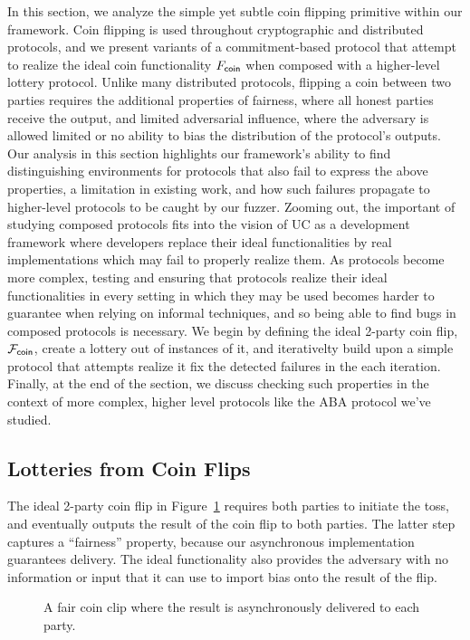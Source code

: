 In this section, we analyze the simple yet subtle coin flipping primitive within our framework.
Coin flipping is used throughout cryptographic and distributed protocols, and we present variants of a commitment-based protocol that attempt to realize the ideal coin functionality $F_{{\mathsf {coin}}}$ when composed with a higher-level lottery protocol.
Unlike many distributed protocols, flipping a coin between two parties requires the additional properties of fairness, where all honest parties receive the output, and limited adversarial influence, where the adversary is allowed limited or no ability to bias the distribution of the protocol's outputs.
Our analysis in this section highlights our framework's ability to find distinguishing environments for protocols that also fail to express the above properties, a limitation in existing work, and how such failures propagate to higher-level protocols to be caught by our fuzzer.
Zooming out, the important of studying composed protocols fits into the vision of UC as a development framework where developers replace their ideal functionalities by real implementations which may fail to properly realize them.
As protocols become more complex, testing and ensuring that protocols realize their ideal functionalities in every setting in which they may be used becomes harder to guarantee when relying on informal techniques, and so being able to find bugs in composed protocols is necessary.
We begin by defining the ideal 2-party coin flip, $\mathcal{F}_{{\mathsf {coin}}}$, create a lottery out of instances of it, and iterativelty build upon a simple protocol that attempts realize it fix the detected failures in the each iteration.
Finally, at the end of the section, we discuss checking such properties in the context of more complex, higher level protocols like the ABA protocol we've studied.

\subsection{Lotteries from Coin Flips}
The ideal 2-party coin flip in Figure~\ref{fig:fcoin} requires both parties to initiate the toss, and eventually outputs the result of the coin flip to both parties.
The latter step captures a ``fairness'' property, because our asynchronous implementation guarantees delivery.
The ideal functionality also provides the adversary with no information or input that it can use to import bias onto the result of the flip.

\begin{figure}
\centering

\caption{A fair coin clip where the result is asynchronously delivered to each party.}
\label{fig:fcoin}
\end{figure}

